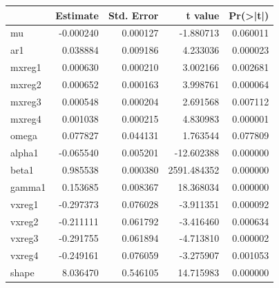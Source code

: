 \documentclass[
  11pt,
]{article}
\newenvironment{Shaded}{\begin{snugshade}}{\end{snugshade}}
\newcommand{\CommentTok}[1]{\textcolor[rgb]{0.56,0.35,0.01}{\textit{#1}}}
\newcommand{\DataTypeTok}[1]{\textcolor[rgb]{0.13,0.29,0.53}{#1}}
\newcommand{\DecValTok}[1]{\textcolor[rgb]{0.00,0.00,0.81}{#1}}
\newcommand{\KeywordTok}[1]{\textcolor[rgb]{0.13,0.29,0.53}{\textbf{#1}}}
\newcommand{\NormalTok}[1]{#1}
\newcommand{\OperatorTok}[1]{\textcolor[rgb]{0.81,0.36,0.00}{\textbf{#1}}}
\newcommand{\OtherTok}[1]{\textcolor[rgb]{0.56,0.35,0.01}{#1}}
\newcommand{\StringTok}[1]{\textcolor[rgb]{0.31,0.60,0.02}{#1}}
\begin{document}
\begin{tabular}{l|r|r|r|r}
\hline
  &  Estimate &  Std. Error &  t value & Pr(>|t|)\\
\hline
mu & -0.000240 & 0.000127 & -1.880713 & 0.060011\\
\hline
ar1 & 0.038884 & 0.009186 & 4.233036 & 0.000023\\
\hline
mxreg1 & 0.000630 & 0.000210 & 3.002166 & 0.002681\\
\hline
mxreg2 & 0.000652 & 0.000163 & 3.998761 & 0.000064\\
\hline
mxreg3 & 0.000548 & 0.000204 & 2.691568 & 0.007112\\
\hline
mxreg4 & 0.001038 & 0.000215 & 4.830983 & 0.000001\\
\hline
omega & 0.077827 & 0.044131 & 1.763544 & 0.077809\\
\hline
alpha1 & -0.065540 & 0.005201 & -12.602388 & 0.000000\\
\hline
beta1 & 0.985538 & 0.000380 & 2591.484352 & 0.000000\\
\hline
gamma1 & 0.153685 & 0.008367 & 18.368034 & 0.000000\\
\hline
vxreg1 & -0.297373 & 0.076028 & -3.911351 & 0.000092\\
\hline
vxreg2 & -0.211111 & 0.061792 & -3.416460 & 0.000634\\
\hline
vxreg3 & -0.291755 & 0.061894 & -4.713810 & 0.000002\\
\hline
vxreg4 & -0.249161 & 0.076059 & -3.275907 & 0.001053\\
\hline
shape & 8.036470 & 0.546105 & 14.715983 & 0.000000\\
\hline
\end{tabular}

\begin{Shaded}
\end{Shaded}
\end{document}
